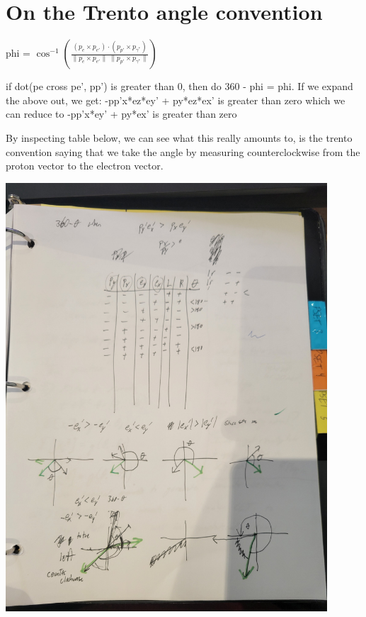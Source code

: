 \chapter{On the Trento angle convention}

phi =    \footnotesize{$\cos^{-1} \left( \frac{ \left(p_{e} \times p_{e'} \right) \cdot \left( p_{p'} \times p_{\gamma^*} \right) }{ \lVert p_{e} \times p_{e'} \rVert \: \lVert p_{p'} \times p_{\gamma^*} \rVert} \right)$}

if dot(pe cross pe', pp') is greater than 0, then do 360 - phi = phi.
If we expand the above out, we get:
-pp'x*ez*ey' + py*ez*ex' is greater than zero
which we can reduce to 
-pp'x*ey' + py*ex' is greater than zero

By inspecting table below, we can see what this really amounts to, is the trento convention saying that we take the angle by measuring counterclockwise from the proton vector to the electron vector.


\includegraphics[width=0.9\textwidth]{basics/phi_math_1.jpg}